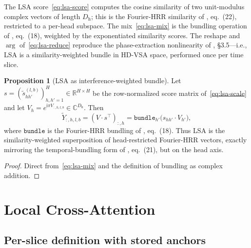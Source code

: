 \documentclass[11pt]{article}
\newcommand{\R}{\mathbb{R}}
\newcommand{\C}{\mathbb{C}}
\newcommand{\im}{\mathrm{i}}
\newcommand{\nh}{H}              %
\newcommand{\Dh}{D_{\mathrm{h}}} %
\newcommand{\ie}{i.e.}
\theoremstyle{definition}
\newtheorem{proposition}{Proposition}
\begin{document}
The LSA score~\eqref{eq:lsa-score} computes the cosine similarity of
two unit-modulus complex vectors of length $\Dh$; this is the
Fourier-HRR similarity of \cite{phasor-ssm-derivation}, eq.~(22),
restricted to a per-head subspace. The mix~\eqref{eq:lsa-mix} is the
bundling operation of \cite{phasor-ssm-derivation}, eq.~(18), weighted
by the exponentiated similarity scores. The reshape and $\arg$
of~\eqref{eq:lsa-reduce} reproduce the
phase-extraction nonlinearity of \cite{phasor-ssm-derivation},
\S3.5---\ie, LSA is a similarity-weighted bundle in HD-VSA space,
performed once per time slice.

\begin{proposition}[LSA as interference-weighted bundle]\label{prop:lsa-hd}
Let $s = (\tilde s_{h h'}^{(l,b)})_{h,h'=1}^{\nh}\in\R^{\nh\times \nh}$
be the row-normalized score matrix of~\eqref{eq:lsa-scale} and let
$V_h = e^{\im\pi V_{:,h,l,b}}\in\C^{\Dh}$. Then
\[
  \tilde Y_{:,h,l,b} = (V \cdot s^\top)_{:,h}
  = \texttt{bundle}_{h'}\!\bigl(s_{h h'}\cdot V_{h'}\bigr),
\]
where $\texttt{bundle}$ is the Fourier-HRR bundling of
\cite{phasor-ssm-derivation}, eq.~(18). Thus LSA is the
similarity-weighted superposition of head-restricted Fourier-HRR
vectors, exactly mirroring the temporal-bundling form of
\cite{phasor-ssm-derivation}, eq.~(21), but on the head axis.
\end{proposition}

\begin{proof}
Direct from~\eqref{eq:lsa-mix} and the definition of bundling as
complex addition.
\end{proof}

\section{Local Cross-Attention}\label{sec:lca}

\subsection{Per-slice definition with stored anchors}
\end{document}
